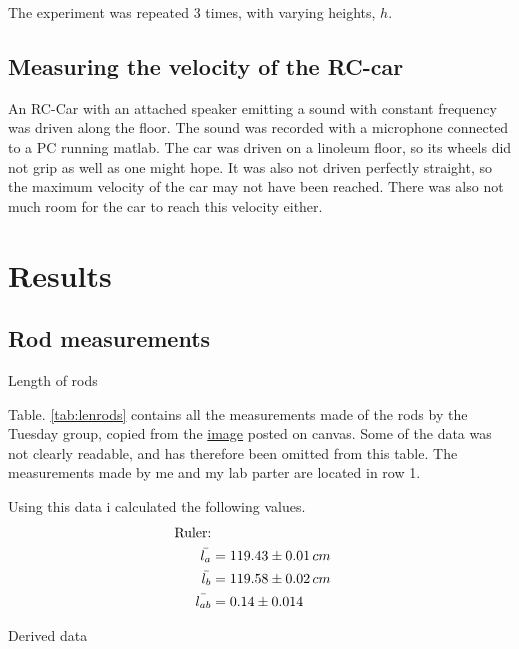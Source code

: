 \documentclass[11pt,a4paper]{article}
\begin{document}
    The experiment was repeated 3 times, with varying heights, $h$.
  
  \subsection{Measuring the velocity of the RC-car}
    An RC-Car with an attached speaker emitting a sound with constant frequency was driven along the floor. The sound was recorded with a microphone connected to a PC running matlab. The car was driven on a linoleum floor, so its wheels did not grip as well as one might hope. It was also not driven perfectly straight, so the maximum velocity of the car may not have been reached. There was also not much room for the car to reach this velocity either.


\section{\label{sec:data} Results}

  \subsection{Rod measurements}
  \begin{table}[H]
    \center
    \caption{Length of rods}
    \label{tab:lenrods}
    
  \end{table}
  Table. \ref{tab:lenrods} contains all the measurements made of the rods by the Tuesday group, copied from the \href{https://uio.instructure.com/courses/910/modules/items/13592}{image} posted on canvas. Some of the data was not clearly readable, and has therefore been omitted from this table. The measurements made by me and my lab parter are located in row 1.

  Using this data i calculated the following values.
  \begin{align}
    \begin{split}
      \textup{Ruler:} \\
      \bar{l_{a}} &= 119.43 \pm  0.01\,cm \\
      \bar{l_{b}} &= 119.58 \pm 0.02 \,cm \\
      \bar{l_{ab}}&= 0.14 \pm 0.014
    \end{split}
  \end{align}

  \begin{table}[H]
    \center
    \caption{Derived data}
    
  \end{table}
\end{document}

